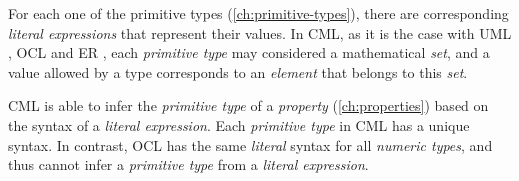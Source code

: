 For each one of the primitive types (\ref{ch:primitive-types}),
there are corresponding \emph{literal expressions}
that represent their values.
In CML, as it is the case with UML \cite{uml}, OCL \cite{ocl} and ER \cite{er},
each \emph{primitive type} may considered a mathematical \emph{set},
and a value allowed by a type corresponds to an \emph{element}
that belongs to this \emph{set}.

CML is able to infer the \emph{primitive type} of a \emph{property} (\ref{ch:properties})
based on the syntax of a \emph{literal expression}.
Each \emph{primitive type} in CML has a unique syntax.
In contrast,
OCL has the same \emph{literal} syntax for all \emph{numeric types},
and thus cannot infer a \emph{primitive type} from a \emph{literal expression}.

